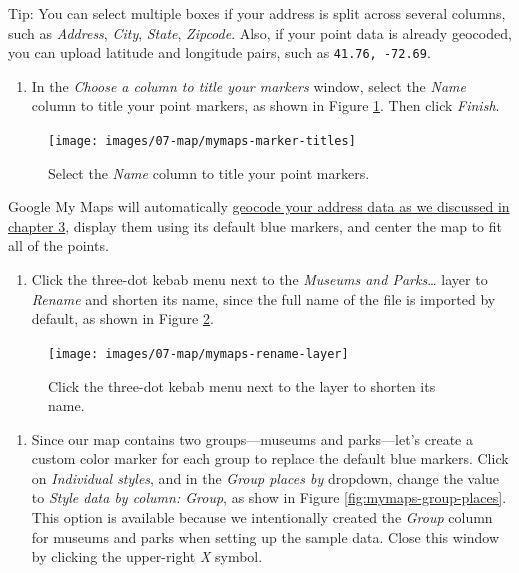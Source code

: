 \documentclass[
  english,
]{book}
\providecommand{\tightlist}{%
  \setlength{\itemsep}{0pt}\setlength{\parskip}{0pt}}
\begin{document}
Tip: You can select multiple boxes if your address is split across several columns, such as \emph{Address}, \emph{City}, \emph{State}, \emph{Zipcode}. Also, if your point data is already geocoded, you can upload latitude and longitude pairs, such as \texttt{41.76,\ -72.69}.

\begin{enumerate}
\def\labelenumi{\arabic{enumi}.}
\setcounter{enumi}{6}
\tightlist
\item
  In the \emph{Choose a column to title your markers} window, select the \emph{Name} column to title your point markers, as shown in Figure \ref{fig:mymaps-marker-titles}. Then click \emph{Finish}.
\end{enumerate}



\begin{figure}
\texttt{[image: images/07-map/mymaps-marker-titles]} \caption{Select the \emph{Name} column to title your point markers.}\label{fig:mymaps-marker-titles}
\end{figure}

Google My Maps will automatically \href{geocode.html}{geocode your address data as we discussed in chapter 3}, display them using its default blue markers, and center the map to fit all of the points.

\begin{enumerate}
\def\labelenumi{\arabic{enumi}.}
\setcounter{enumi}{7}
\tightlist
\item
  Click the three-dot kebab menu next to the \emph{Museums and Parks\ldots{}} layer to \emph{Rename} and shorten its name, since the full name of the file is imported by default, as shown in Figure \ref{fig:mymaps-rename-layer}.
\end{enumerate}



\begin{figure}
\texttt{[image: images/07-map/mymaps-rename-layer]} \caption{Click the three-dot kebab menu next to the layer to shorten its name.}\label{fig:mymaps-rename-layer}
\end{figure}

\begin{enumerate}
\def\labelenumi{\arabic{enumi}.}
\setcounter{enumi}{8}
\tightlist
\item
  Since our map contains two groups---museums and parks---let's create a custom color marker for each group to replace the default blue markers. Click on \emph{Individual styles}, and in the \emph{Group places by} dropdown, change the value to \emph{Style data by column: Group}, as show in Figure \ref{fig:mymaps-group-places}. This option is available because we intentionally created the \emph{Group} column for museums and parks when setting up the sample data. Close this window by clicking the upper-right \emph{X} symbol.
\end{enumerate}
\end{document}
